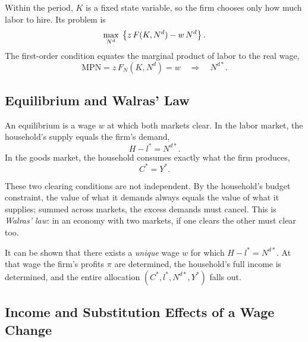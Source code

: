 Within the period, $K$ is a fixed state variable, so the firm chooses only how much labor to hire. Its problem is
\[
\max_{N^d}\; \left\{ z\,F(K, N^d) - w\,N^d \right\}.
\]
The first-order condition equates the marginal product of labor to the real wage,
\[
\mathrm{MPN} = z\,F_N(K, N^d) = w \quad\Longrightarrow\quad N^{d*}.
\]


\subsection{Equilibrium and Walras' Law}

An equilibrium is a wage $w$ at which both markets clear. In the labor market, the household's supply equals the firm's demand,
\[
H - l^* = N^{d*}.
\]
In the goods market, the household consumes exactly what the firm produces,
\[
C^* = Y^*.
\]

These two clearing conditions are not independent. By the household's budget constraint, the value of what it demands always equals the value of what it supplies; summed across markets, the excess demands must cancel. This is \emph{Walras' law}: in an economy with two markets, if one clears the other must clear too.


It can be shown that there exists a \emph{unique} wage $w$ for which $H - l^* = N^{d*}$. At that wage the firm's profits $\pi$ are determined, the household's full income is determined, and the entire allocation $(C^*, l^*, N^{d*}, Y^*)$ falls out.

\subsection{Income and Substitution Effects of a Wage Change}

